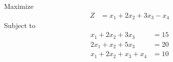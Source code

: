 \documentclass[12pt]{article}
\begin{document}
\subsection{}
Maximize
\begin{align*}
Z                        & = x_{1}+2x_{2}+3x_{3}-x_{4}
\end{align*}
Subject to
\begin{align*}
x_{1}+2x_{2}+3x_{3}      & = 15                                                                                                                                                                                                                                                             \\
2x_{1}+x_{2}+5x_{3}      & = 20                                                                                                                                                                                                                                                             \\
x_{1}+2x_{2}+x_{3}+x_{4} & = 10                                                                                                                                                                                                                                                             \\
\end{align*}
\end{document}
